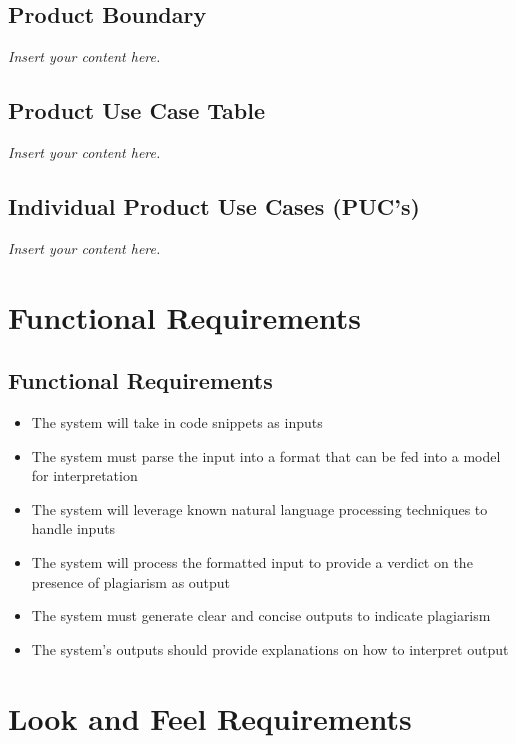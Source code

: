 \documentclass[12pt]{article}
\newcommand{\lips}{\textit{Insert your content here.}}
\begin{document}
\subsection{Product Boundary}
\lips
\subsection{Product Use Case Table}
\lips
\subsection{Individual Product Use Cases (PUC's)}
\lips

\section{Functional Requirements}
\subsection{Functional Requirements}
\begin{itemize}
    \item The system will take in code snippets as inputs
    \item The system must parse the input into a format that can be fed into a model for interpretation
    \item The system will leverage known natural language processing techniques to handle inputs
    \item The system will process the formatted input to provide a verdict on the presence of plagiarism as output
    \item The system must generate clear and concise outputs to indicate plagiarism
    \item The system's outputs should provide explanations on how to interpret output
\end{itemize}

\section{Look and Feel Requirements}
\end{document}
